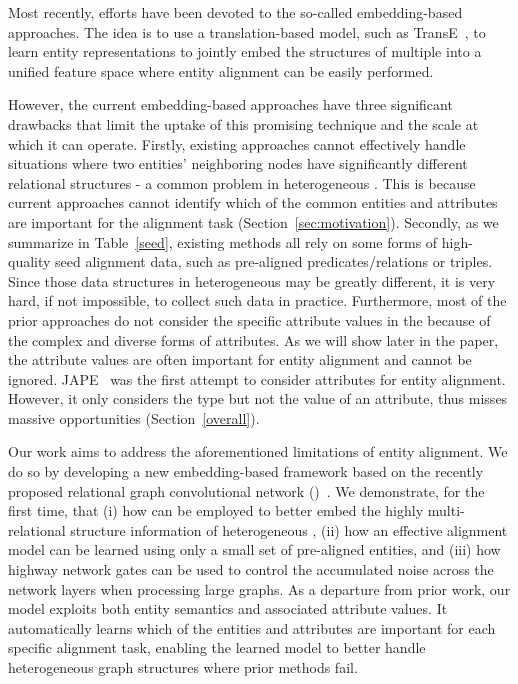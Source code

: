 	Most recently, efforts have been devoted to the so-called \KG embedding-based approaches. The idea is to use a translation-based model,
such as TransE~\cite{bordes2013translating}, to learn entity representations to jointly embed the structures of multiple \KGs into a
unified feature space where entity alignment can be easily performed. %

However, the current \KG embedding-based approaches have three significant drawbacks that limit the uptake of this promising technique and
the scale at which it can operate. Firstly, existing approaches cannot effectively handle situations where two entities' neighboring nodes
have significantly different relational structures - a common problem in heterogeneous \KGs. This is because current approaches cannot
identify which of the common entities and attributes are important for the alignment task (Section~\ref{sec:motivation}). Secondly, as we
summarize in Table~\ref{seed}, existing methods all rely on some forms of high-quality seed alignment data, such as pre-aligned \KG
predicates/relations or triples. Since those data structures in heterogeneous \KGs may be greatly different, it is very hard, if not
impossible, to collect such data in practice. Furthermore, most of the prior approaches do not consider the specific attribute values in
the \KGs because of the complex and diverse forms of attributes. As we will show later in the paper, the attribute values are often
important for entity alignment and cannot be ignored. JAPE~\cite{sun2017cross} was the first attempt to consider attributes for entity
alignment. However, it only considers the type but not the value of an attribute, thus misses massive opportunities
(Section~\ref{overall}).

Our work aims to address the aforementioned limitations of entity alignment. We do so by developing a new embedding-based framework based on the recently proposed relational graph convolutional network (\RGCN)~\cite{Schlichtkrull2017Modeling}. We demonstrate, for the first
time, that (i) how \RGCNs can be employed to better embed the highly multi-relational structure information of heterogeneous \KGs, (ii) how
an effective alignment model can be learned using only a small set of pre-aligned entities, and (iii) how highway network gates can be used
to control the accumulated noise across the network layers when processing large graphs. As a departure from prior work, our model exploits
both entity semantics and associated attribute values. It automatically learns which of the entities and attributes are important for each
specific alignment task, enabling the learned model to better handle heterogeneous graph structures where prior methods fail.

